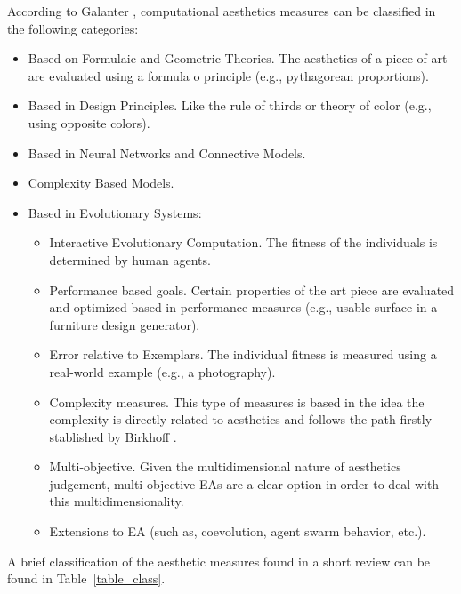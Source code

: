 \documentclass[conference]{IEEEtran}
\begin{document}
According to Galanter \cite{galanter2012computational}, computational aesthetics measures can be classified in the following categories:
\begin{itemize}
	\item Based on Formulaic and Geometric Theories. The aesthetics of a piece of art are evaluated using a formula o principle (e.g., pythagorean proportions).
	\item Based in Design Principles. Like the rule of thirds or theory of color (e.g., using opposite colors).
	\item Based in Neural Networks and Connective Models. 
	\item Complexity Based Models. 
	\item Based in Evolutionary Systems:
		\begin{itemize}
			\item Interactive Evolutionary Computation. The fitness of the individuals is determined by human agents.
			\item Performance based goals. Certain properties of the art piece are evaluated and optimized based in performance measures (e.g., usable surface in a furniture design generator).  
			\item Error relative to Exemplars. The individual fitness is measured using a real-world example (e.g., a photography).
			\item Complexity measures. This type of measures is based in the idea the complexity is directly related to aesthetics and follows the path firstly stablished by Birkhoff \cite{birkhoff2003aesthetic}.
			\item Multi-objective. Given the multidimensional nature of aesthetics judgement, multi-objective EAs are a clear option in order to deal with this multidimensionality.
			\item Extensions to EA (such as, coevolution, agent swarm behavior, etc.).
		\end{itemize}
\end{itemize}

A brief classification of the aesthetic measures found in a short review can be found in Table~\ref{table_class}.
\end{document}
